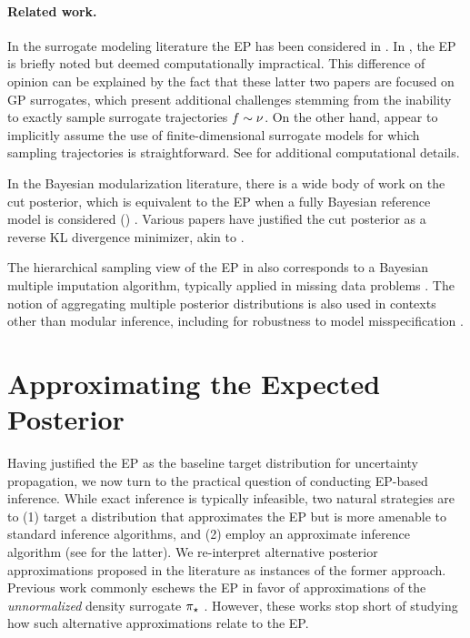 \documentclass[12pt]{article}
\begin{document}
\paragraph{Related work.} In the surrogate modeling literature the EP has been considered 
in \citet{trainDynamics,BurknerSurrogate,garegnani2021NoisyMCMC}. In 
\citet{StuartTeck2,VehtariParallelGP}, the EP is briefly noted but deemed computationally impractical. 
This difference of opinion can be explained by the fact that these latter two papers are focused 
on GP surrogates, which present additional challenges stemming from the inability to exactly 
sample surrogate trajectories $f \sim \nu$. On the other hand, 
\citet{BurknerSurrogate,garegnani2021NoisyMCMC} appear to implicitly assume the use of 
finite-dimensional surrogate models for which sampling trajectories is straightforward.
See  for additional computational details.

In the Bayesian modularization literature, there is a wide body of work 
on the cut posterior, which is equivalent to the EP 
when a fully Bayesian reference model is considered ()
\citep{PlummerCut,cutInference,moduleModels}.
Various papers have justified the cut posterior as a reverse KL divergence minimizer, 
akin to  \citep{cutVar,cutVar2,moduleModels}. 

The hierarchical sampling view of the EP in  also 
corresponds to a Bayesian multiple imputation algorithm, typically applied
in missing data problems \citep{multipleImputationMedical,missingData}.
The notion of aggregating multiple posterior distributions is also used in 
contexts other than modular inference, including for robustness to model 
misspecification \citep{BayesBag,BayesBag2}.

\section{Approximating the Expected Posterior} \label{sec:approximating-ep}
Having justified the EP as the baseline target distribution for uncertainty 
propagation, we now turn to the practical question of conducting EP-based
inference. While exact inference is typically infeasible, two 
natural strategies are to
(1) target a distribution that approximates the EP but is more amenable
to standard inference algorithms, and (2) employ an approximate 
inference algorithm (see  for the latter). We re-interpret 
alternative posterior approximations proposed in the literature 
as instances of the former approach. Previous work commonly
eschews the EP in favor of approximations of the \textit{unnormalized}
density surrogate ${\pi}_{\star}$ \citep{StuartTeck1,StuartTeck2,VehtariParallelGP}.
However, these works stop short of studying how such alternative approximations 
relate to the EP. 
\end{document}
